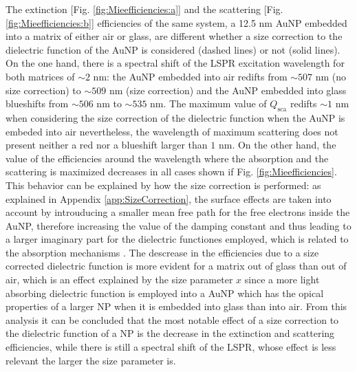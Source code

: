 The extinction [Fig. \ref{fig:Mieefficiencies:a}] and the scattering [Fig. \ref{fig:Mieefficiencies:b}] efficiencies of the same system, a 12.5 nm AuNP embedded into a matrix of either air or glass, are different whether a size correction to the dielectric function of the AuNP is considered (dashed lines) or not (solid lines). On the one hand, there is a spectral shift of the LSPR excitation wavelength for both matrices of $\sim 2$ nm: the AuNP embedded into air redifts from $\sim 507$ nm (no size correction) to $\sim 509$ nm (size correction) and the AuNP embedded into glass blueshifts from $\sim 506$ nm to $\sim 535$ nm. The maximum value of $Q_\text{sca}$ redifts $\sim 1$ nm when considering the size correction of the dielectric function when the AuNP is embeded into air nevertheless, the wavelength of maximum scattering does not present neither a red nor a blueshift larger than $1$ nm. On the other hand, the value of the efficiencies around the wavelength where the absorption and the scattering is maximized decreases in all cases shown if Fig. \ref{fig:Mieefficiencies}.  This behavior can be explained by how the size correction is performed: as explained in Appendix \ref{app:SizeCorrection}, the surface effects are taken into account by introuducing a smaller mean free path for the free electrons inside the AuNP, therefore increasing the value of the damping constant and thus leading to a larger imaginary part for the dielectric functiones employed, which is related to the absorption mechanisms \cite{ibach_solid-state_2009}. The descrease in the efficiencies due to a size corrected dielectric function is more evident for a matrix out of glass than out of air, which is an effect explained by the size parameter $x$ since a more light absorbing dielectric function is employed into a AuNP which has the opical properties of a larger NP when it is embedded into glass than into air. From this analysis it can be concluded that the most notable effect of a size correction to the dielectric function of a NP is the decrease in the extinction and scattering efficiencies, while there is still a spectral shift of the LSPR, whose effect is less relevant the larger the size parameter is.

